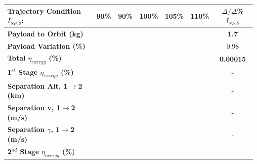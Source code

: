 \begin{table}[ht]
	\centering
	\begin{tabular}{l c c c c c c} 
		\hline \textbf{Trajectory Condition}   \qquad  $I_{SP,2}$:
		&90\%
		&90\%
		&100\%
		&105\%
		&110\%
		& $\Delta/\Delta$\%$I_{SP,2}$
		\\
		\hline \textbf{Payload to Orbit (kg)}
		& \textbf{\PayloadToOrbitIspNinety}
		& \textbf{\PayloadToOrbitIspNinetyFive}
		& \textbf{\PayloadToOrbitIspStandard}
		& \textbf{\PayloadToOrbitIspOneHundredFive}
		& \textbf{\PayloadToOrbitIspOneHundredTen}
		&\textbf{1.7}
		\\
		\textbf{Payload Variation (\%)}
		& \PayloadVarIspNinety
		& \PayloadVarIspNinetyFive
		& \PayloadVarIspStandard
		& \PayloadVarIspOneHundredFive
		& \PayloadVarIspOneHundredTen
		&0.98
		\\
		\textbf{Total $\eta_{exergy}$ (\%)}
		& \textbf{\totalExergyEffIspNinety}
		& \textbf{\totalExergyEffIspNinetyFive}
		& \textbf{\totalExergyEffIspStandard}
		& \textbf{\totalExergyEffIspOneHundredFive}
		& \textbf{\totalExergyEffIspOneHundredTen}
		& \textbf{0.00015}
		\\
		\hline 
		\textbf{1$^{st}$ Stage $\eta_{exergy}$ (\%)}
		& \textbf{\firstExergyEffIspNinety}
		& \textbf{\firstExergyEffIspNinetyFive}
		& \textbf{\firstExergyEffIspStandard}
		& \textbf{\firstExergyEffIspOneHundredFive}
		& \textbf{\firstExergyEffIspOneHundredTen}
		& -
		\\
		\textbf{Separation Alt, 1$\rightarrow$2 (km)}
		& \firstsecondSeparationAltIspNinety
		& \firstsecondSeparationAltIspNinetyFive
		& \firstsecondSeparationAltIspStandard
		& \firstsecondSeparationAltIspOneHundredFive
		& \firstsecondSeparationAltIspOneHundredTen
		& -
		\\
		\textbf{Separation v, 1$\rightarrow$2 (m/s)}
		& \firstsecondSeparationvIspNinety
		& \firstsecondSeparationvIspNinetyFive
		& \firstsecondSeparationvIspStandard
		& \firstsecondSeparationvIspOneHundredFive
		& \firstsecondSeparationvIspOneHundredTen
		& -
		\\
		\textbf{Separation $\gamma$, 1$\rightarrow$2 (m/s)}
		& \firstsecondSeparationgammaIspNinety
		& \firstsecondSeparationgammaIspNinetyFive
		& \firstsecondSeparationgammaIspStandard
		& \firstsecondSeparationgammaIspOneHundredFive
		& \firstsecondSeparationgammaIspOneHundredTen
		& -
		\\
		\hline 
		\textbf{2$^{nd}$ Stage $\eta_{exergy}$ (\%)}
		& \textbf{\secondExergyEffIspNinety}
		& \textbf{\secondExergyEffIspNinetyFive}
		& \textbf{\secondExergyEffIspStandard}

\end{tabular}
\end{table}
